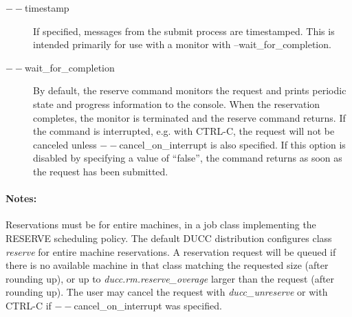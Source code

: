 \begin{description}
           \item[$--$timestamp ]
             If specified, messages from the submit process are timestamped. This is intended primarily 
             for use with a monitor with --wait\_for\_completion. 

           \item[$--$wait\_for\_completion ]             
             By default, the reserve command monitors the request and prints periodic
             state and progress information to the console.  When the reservation completes, the monitor
             is terminated and the reserve command returns.  If the command is interrupted, e.g. with CTRL-C,
             the request will not be canceled unless $--$cancel\_on\_interrupt is also specified.
             If this option is disabled by specifying a value of ``false'', the command returns as
             soon as the request has been submitted.


        \end{description}
            
    \paragraph{Notes:}
    Reservations must be for entire machines, in a job class implementing the RESERVE scheduling
    policy. The default DUCC distribution configures class {\em reserve} for entire machine
    reservations.  A reservation request will be queued if there is no available machine in that
    class matching the requested size (after rounding up), or up to {\em ducc.rm.reserve\_overage}
    larger than the request (after rounding up).
    The user may cancel the request with {\em ducc\_unreserve} 
    or with CTRL-C if $--$cancel\_on\_interrupt was specified.
